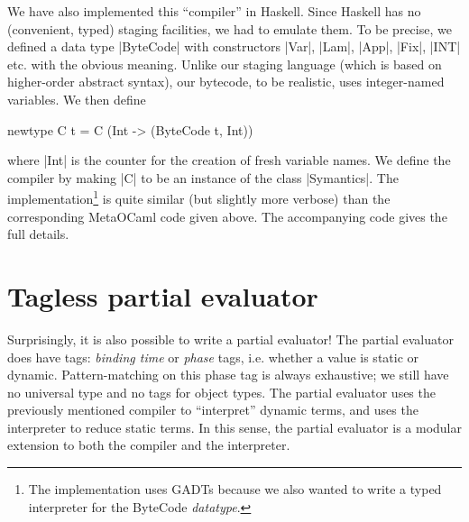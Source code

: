 \documentclass[preprint]{sigplanconf}
\begin{document}
We have also implemented this ``compiler'' in Haskell. Since Haskell
has no (convenient, typed) staging facilities, we had to emulate
them. To be precise, we defined a data type |ByteCode| with
constructors |Var|, |Lam|, |App|, |Fix|, |INT| etc. with the obvious
meaning. Unlike our staging language (which is based on higher-order
abstract syntax), our bytecode, to be realistic, uses integer-named
variables. We then define 
\begin{code}
  newtype C t = C (Int -> (ByteCode t, Int)) 
\end{code}
where |Int| is the counter for the creation of fresh variable
names. We define the compiler by making |C| to be an instance of the
class |Symantics|. The implementation\footnote{The implementation uses
GADTs because we also wanted to write a typed interpreter for 
the \textsf{ByteCode} \emph{datatype}.} is quite similar (but slightly more
verbose) than the corresponding MetaOCaml code given above. The
accompanying code gives the full details.

\section{Tagless partial evaluator}\label{PE}

Surprisingly, it is also possible to write a partial evaluator!  The
partial evaluator does have tags: \emph{binding time} or \emph{phase}
tags, i.e. whether a value is static or dynamic.
Pattern-matching on this phase tag is always exhaustive; we still
have no universal type and no tags for object types.  The partial
evaluator uses the previously mentioned compiler to ``interpret'' dynamic
terms, and uses the interpreter to reduce static terms.  In this sense, 
the partial evaluator is a modular extension to both the compiler and
the interpreter. 
\end{document}
